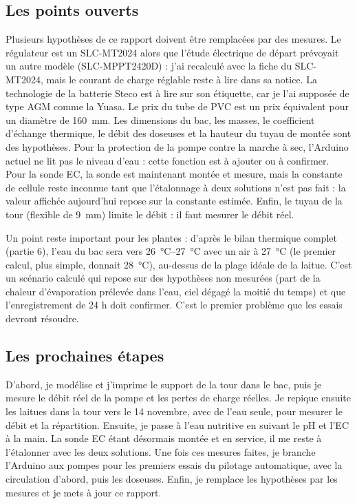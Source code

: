 \subsection{Les points ouverts}

Plusieurs hypothèses de ce rapport doivent être remplacées par des mesures. Le régulateur est un SLC-MT2024 alors que l'étude électrique de départ prévoyait un autre modèle (SLC-MPPT2420D) : j'ai recalculé avec la fiche du SLC-MT2024, mais le courant de charge réglable reste à lire dans sa notice. La technologie de la batterie Steco est à lire sur son étiquette, car je l'ai supposée de type AGM comme la Yuasa. Le prix du tube de PVC est un prix équivalent pour un diamètre de \qty{160}{mm}. Les dimensions du bac, les masses, le coefficient d'échange thermique, le débit des doseuses et la hauteur du tuyau de montée sont des hypothèses. Pour la protection de la pompe contre la marche à sec, l'Arduino actuel ne lit pas le niveau d'eau : cette fonction est à ajouter ou à confirmer. Pour la sonde EC, la sonde est maintenant montée et mesure, mais la constante de cellule reste inconnue tant que l'étalonnage à deux solutions n'est pas fait : la valeur affichée aujourd'hui repose sur la constante estimée. Enfin, le tuyau de la tour (flexible de \qty{9}{mm}) limite le débit : il faut mesurer le débit réel.

Un point reste important pour les plantes : d'après le bilan thermique complet (partie 6), l'eau du bac sera vers \qtyrange{26}{27}{\celsius} avec un air à \qty{27}{\celsius} (le premier calcul, plus simple, donnait \qty{28}{\celsius}), au-dessus de la plage idéale de la laitue. C'est un scénario calculé qui repose sur des hypothèses non mesurées (part de la chaleur d'évaporation prélevée dans l'eau, ciel dégagé la moitié du temps) et que l'enregistrement de 24 h doit confirmer. C'est le premier problème que les essais devront résoudre.

\subsection{Les prochaines étapes}

D'abord, je modélise et j'imprime le support de la tour dans le bac, puis je mesure le débit réel de la pompe et les pertes de charge réelles. Je repique ensuite les laitues dans la tour vers le 14 novembre, avec de l'eau seule, pour mesurer le débit et la répartition. Ensuite, je passe à l'eau nutritive en suivant le pH et l'EC à la main. La sonde EC étant désormais montée et en service, il me reste à l'étalonner avec les deux solutions. Une fois ces mesures faites, je branche l'Arduino aux pompes pour les premiers essais du pilotage automatique, avec la circulation d'abord, puis les doseuses. Enfin, je remplace les hypothèses par les mesures et je mets à jour ce rapport.

